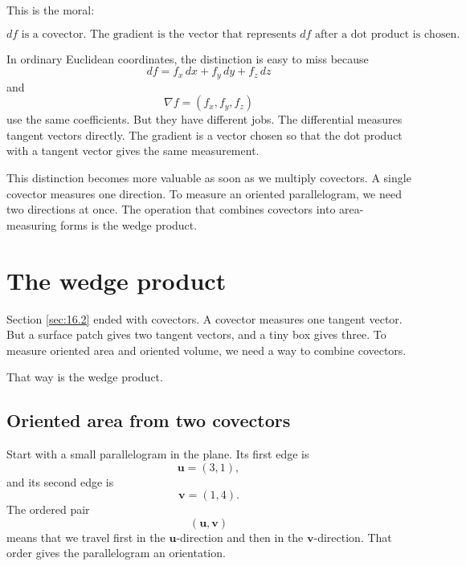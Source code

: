 This is the moral:

\[
\boxed{
    df \text{ is a covector.  The gradient is the vector that represents } df
    \text{ after a dot product is chosen.}
}
\]

In ordinary Euclidean coordinates, the distinction is easy to miss because
\[
    df=f_x\,dx+f_y\,dy+f_z\,dz
\]
and
\[
    \nabla f=(f_x,f_y,f_z)
\]
use the same coefficients.  But they have different jobs.  The differential measures
tangent vectors directly.  The gradient is a vector chosen so that the dot product with
a tangent vector gives the same measurement.

This distinction becomes more valuable as soon as we multiply covectors.  A single
covector measures one direction.  To measure an oriented parallelogram, we need two
directions at once.  The operation that combines covectors into area-measuring forms
is the wedge product.

\section{The wedge product}
\label{sec:16.3}

Section \ref{sec:16.2} ended with covectors.  A covector measures one tangent vector.
But a surface patch gives two tangent vectors, and a tiny box gives three.  To measure
oriented area and oriented volume, we need a way to combine covectors.

That way is the wedge product.

\subsection{Oriented area from two covectors}

Start with a small parallelogram in the plane.  Its first edge is
\[
    \mathbf u=(3,1),
\]
and its second edge is
\[
    \mathbf v=(1,4).
\]
The ordered pair
\[
    (\mathbf u,\mathbf v)
\]
means that we travel first in the \(\mathbf u\)-direction and then in the
\(\mathbf v\)-direction.  That order gives the parallelogram an orientation.

